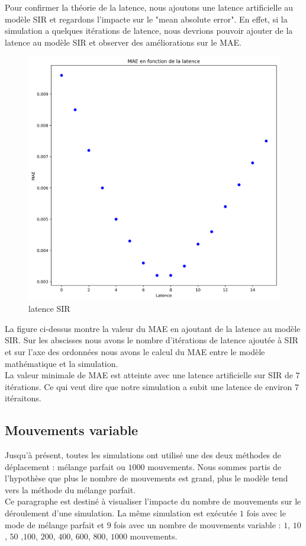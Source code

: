 Pour confirmer la théorie de la latence, nous ajoutons une latence artificielle au modèle SIR et regardons l'impacte sur le "mean absolute error". En effet, si la simulation a quelques itérations de latence, nous devrions pouvoir ajouter de la latence au modèle SIR et observer des améliorations sur le MAE.\\

\begin{figure}
    \centering
	\captionsetup{justification=centering}
	\includegraphics[width=.5\textwidth]{Images/SIR_latence_8_5.png}
	\caption{latence SIR}
\end{figure}

La figure ci-dessus montre la valeur du MAE en ajoutant de la latence au modèle SIR. Sur les abscisses nous avons le nombre d'itérations de latence ajoutée à SIR et sur l'axe des ordonnées nous avons le calcul du MAE entre le modèle mathématique et la simulation.\\

La valeur minimale de MAE est atteinte avec une latence artificielle sur SIR de $7$ itérations. Ce qui veut dire que notre simulation a subit une latence de environ $7$ itéraitons.

\newpage

\subsection{Mouvements variable}

Jusqu'à présent, toutes les simulations ont utilisé une des deux méthodes de déplacement : mélange parfait ou $1000$ mouvements. Nous sommes partis de l'hypothèse que plus le nombre de mouvements est grand, plus le modèle tend vers la méthode du mélange parfait.\\

Ce paragraphe est destiné à visualiser l'impacte du nombre de mouvements sur le déroulement d'une simulation. La même simulation est exécutée $1$ fois avec le mode de mélange parfait et $9$ fois avec un nombre de mouvements variable : $1$, $10$, $50$ ,$100$, $200$, $400$, $600$, $800$, $1000$ mouvements.

